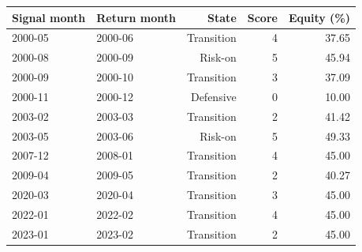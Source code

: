 \begin{tabular}{@{}llrrr@{}}\toprule
Signal month & Return month & State & Score & Equity (\%)\\\midrule
2000-05 & 2000-06 & Transition & 4 & 37.65\\
2000-08 & 2000-09 & Risk-on & 5 & 45.94\\
2000-09 & 2000-10 & Transition & 3 & 37.09\\
2000-11 & 2000-12 & Defensive & 0 & 10.00\\
2003-02 & 2003-03 & Transition & 2 & 41.42\\
2003-05 & 2003-06 & Risk-on & 5 & 49.33\\
2007-12 & 2008-01 & Transition & 4 & 45.00\\
2009-04 & 2009-05 & Transition & 2 & 40.27\\
2020-03 & 2020-04 & Transition & 3 & 45.00\\
2022-01 & 2022-02 & Transition & 4 & 45.00\\
2023-01 & 2023-02 & Transition & 2 & 45.00\\
\bottomrule
\end{tabular}
